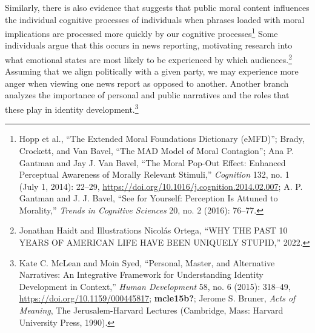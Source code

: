 \documentclass[
  12pt,
]{book}
\theoremstyle{definition}
\theoremstyle{definition}
\theoremstyle{definition}
\theoremstyle{definition}
\theoremstyle{remark}
\begin{document}
Similarly, there is also evidence that suggests that public moral content influences the individual cognitive processes of individuals when phrases loaded with moral implications are processed more quickly by our cognitive processes\footnote{Hopp et al., {``The Extended {Moral Foundations Dictionary} ({eMFD})''}; Brady, Crockett, and Van Bavel, {``The {MAD} Model of Moral Contagion''}; Ana P. Gantman and Jay J. Van Bavel, {``The Moral Pop-Out Effect: {Enhanced} Perceptual Awareness of Morally Relevant Stimuli,''} \emph{Cognition} 132, no. 1 (July 1, 2014): 22--29, \url{https://doi.org/10.1016/j.cognition.2014.02.007}; A. P. Gantman and J. J. Bavel, {``See for Yourself: Perception Is Attuned to Morality,''} \emph{Trends in Cognitive Sciences} 20, no. 2 (2016): 76--77.} Some individuals argue that this occurs in news reporting, motivating research into what emotional states are most likely to be experienced by which audiences.\footnote{Jonathan Haidt and Illustrations Nicolás Ortega, {``{WHY THE PAST} 10 {YEARS OF AMERICAN LIFE HAVE BEEN UNIQUELY STUPID},''} 2022.} Assuming that we align politically with a given party, we may experience more anger when viewing one news report as opposed to another. Another branch analyzes the importance of personal and public narratives and the roles that these play in identity development.\footnote{Kate C. McLean and Moin Syed, {``Personal, {Master}, and {Alternative Narratives}: {An Integrative Framework} for {Understanding Identity Development} in {Context},''} \emph{Human Development} 58, no. 6 (2015): 318--49, \url{https://doi.org/10.1159/000445817}; \textbf{mcle15b?}; Jerome S. Bruner, \emph{Acts of Meaning}, The {Jerusalem-Harvard} Lectures (Cambridge, Mass: Harvard University Press, 1990).}
\end{document}

